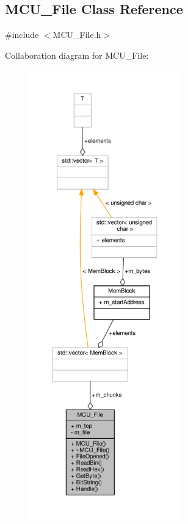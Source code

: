 \subsection{M\+C\+U\+\_\+\+File Class Reference}
\label{classMCU__File}


{\ttfamily \#include $<$M\+C\+U\+\_\+\+File.\+h$>$}



Collaboration diagram for M\+C\+U\+\_\+\+File\+:
\nopagebreak
\begin{figure}[H]
\begin{center}
\leavevmode
\includegraphics[height=550pt]{dc/d54/classMCU__File__coll__graph}
\end{center}
\end{figure}
